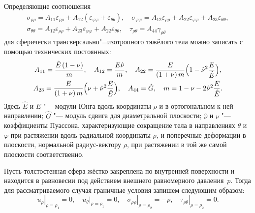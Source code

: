 Определяющие соотношения
\begin{equation}
\begin{array}{c}
\label{zai:eq3} \sigma _{\rho \rho } = A_{11} \varepsilon _{\rho \rho }
+ A_{12} \left( {\varepsilon _{\varphi \varphi } + \varepsilon
_{\theta \theta } } \right), \quad \sigma _{\varphi \varphi } =
A_{12} \varepsilon _{\rho \rho } + A_{22} \varepsilon _{\varphi
\varphi } + A_{23} \varepsilon _{\theta \theta } ,\\
\sigma _{\theta \theta } = A_{12} \varepsilon _{\rho \rho } +
A_{23} \varepsilon _{\varphi \varphi } + A_{22} \varepsilon _{\theta
\theta } , \quad \tau _{\rho \theta } = A_{44} \gamma _{\rho \theta}
\end{array}
\end{equation}
\noindent для сферически трансверсально"=изотропного тяжёлого тела
можно записать с помощью технических постоянных:
\begin{gather*}
 A_{11} = \frac{\hat
{E}\left( {1 - \nu } \right)} {m} , \quad A_{12} = \frac{E\hat {\nu
}} {m} , \quad A_{22} = \frac{E}{\left( {1 + \nu } \right)m}\Bigl(
{1 - \hat {\nu }^2\frac{E}{\hat {E}}} \Bigr) ,
\\
A_{23} = \frac{E}{\left( {1 +
\nu } \right)m}\Bigl( {\nu + \hat {\nu }^2\frac{E}{\hat {E}}}
\Bigr), \quad A_{44} = \hat {G}, \quad m = 1 - \nu - 2\hat {\nu
}^2\frac{E}{\hat {E}} .
\end{gather*}
\noindent Здесь $\hat {E}$ и $E$ "--- модули Юнга вдоль координаты
$\rho $ и в ортогональном к ней направлении; $\hat {G}$ "--- модуль
сдвига для диаметральной плоскости; $\hat {\nu }$ и $\nu $ "---
коэффициенты Пуассона, характеризующие сокращение тела в
направлениях $\theta $ и $\varphi $ при растяжении вдоль радиальной
координаты $\rho $, и поперечные деформации в плоскости, нормальной
радиус-вектору $\rho $, при растяжении в той же самой плоскости
соответственно.

Пусть толстостенная сфера жёстко закреплена по внутренней
поверхности и находится в равновесии под действием внешнего
равномерного давления~$p$. Тогда для рассматриваемого случая
граничные условия запишем следующим образом:
\begin{equation}
\label{zai:eq4} \left. {u_\rho } \right|_{\rho = \rho _1 } = 0, \quad
\left. {u_\theta } \right|_{\rho = \rho _1 } = 0, \quad \left.
{\sigma _{\rho \rho } } \right|_{\rho = \rho _2 } = - p, \quad
\left. {\tau _{\rho \theta } } \right|_{\rho = \rho _2 } = 0.
\end{equation}

